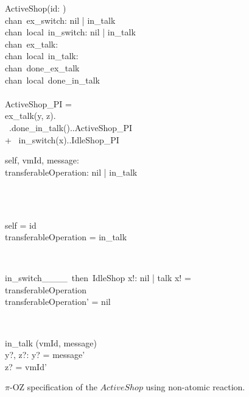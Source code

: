 \begin{figure}[H]
\centering
\begin{class}{ActiveShop(id: \integer)}
\ 
\\chan\ ex\_switch: nil | in\_talk
\ 
\\chan\ local\ in\_switch: nil | in\_talk
\ 
\\chan\ ex\_talk:\integer \times \integer
\ 
\\chan\ local\ in\_talk:\integer \times \integer
\ 
\\chan\ done\_ex\_talk
\ 
\\chan\ local\ done\_in\_talk
\ \\ \
\\ActiveShop\_PI = 
\\ \qquad ex\_talk(y, z).\out{in\_talk}{y,z}
\\ \ \qquad \qquad \qquad .done\_in\_talk()..ActiveShop\_PI 
\\ \qquad + \ in\_switch(x)..IdleShop\_PI
\\\begin{state}
self, vmId, message: \integer
\\transferableOperation: nil | in\_talk
\end{state} 
\\
\begin{init}
\\self = id
\\transferableOperation = in\_talk
\end{init} 
\\
\begin{op}{in\_switch\_\_\_\_\ then\ IdleShop}
x!: nil | talk
\ST
x! = transferableOperation
\\transferableOperation' = nil
\end{op}
\\
\begin{op}{in\_talk}
\Delta (vmId, message)
\\y?, z?: \integer
\ST
y? = message'
\\z? = vmId'
\end{op}
\end{class}
\caption{$\pi$-OZ specification of the $ActiveShop$ using non-atomic reaction.}
\label{comp_oz_pi_statefull_activeShop_non_atomic}
\end{figure}